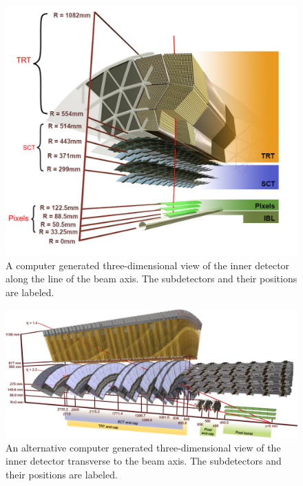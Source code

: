 \begin{figure}[hbtp]
\includegraphics[width=\fullfig]{figures/id_slice.png}
\caption{A computer generated three-dimensional view of the inner detector along the line of the beam axis. The subdetectors and their positions are labeled.}
\label{fig:id_slice}
\end{figure}


\begin{figure}[hbtp]
\includegraphics[width=\fullfig]{figures/id_slice_long.pdf}
\caption{An alternative computer generated three-dimensional view of the inner detector transverse to the beam axis. The subdetectors and their positions are labeled.}
\label{fig:id_slice_long}
\end{figure}

